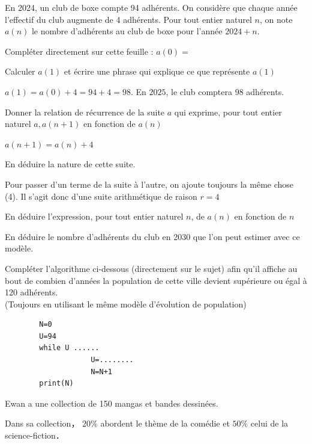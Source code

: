 \documentclass[11pt,a4paper]{article}  %
\begin{document}
En 2024, un club de boxe compte 94 adhérents. On considère que chaque année l'effectif du club augmente de 4 adhérents. Pour tout entier naturel $n$, on note $a(n)$ le nombre d'adhérents au club de boxe pour l'année $2024+n$.
\begin{enumMet}
	\item Compléter directement sur cette feuille : $a(0)=$\quad{}
	\item Calculer $a(1)$ et écrire une phrase qui explique ce que représente $a(1)$
	\begin{corrBox}
		$a(1)=a(0)+4=94+4=98$. En $2025$, le club comptera 98 adhérents.		
	\end{corrBox}
	\item \begin{enumMet}
		\item Donner la relation de récurrence de la suite $a$ qui exprime, pour tout entier naturel $a, a(n+1)$ en fonction de $a(n)$
		\begin{corrBox}
			$a(n+1)=a(n)+4$		
		\end{corrBox}
		\item En déduire la nature de cette suite.
		\begin{corrBox}
			Pour passer d'un terme de la suite à l'autre, on ajoute toujours la même chose (4). Il s'agit donc d'une suite arithmétique de raison $r=4$		
		\end{corrBox}
	\end{enumMet}
	\item En déduire l'expression, pour tout entier naturel $n$, de $a(n)$ en fonction de $n$
	\item En déduire le nombre d'adhérents du club en 2030 que l'on peut estimer avec ce modèle.
	\item Compléter l'algorithme ci-dessous (directement sur le sujet) afin qu'il affiche au bout de combien d'années la population de cette ville devient supérieure ou égal à 120 adhérents.\\
	(Toujours en utilisant le même modèle d'évolution de population)
	\begin{verbatim}
		N=0
		U=94
		while U ......
					U=........
					N=N+1
		print(N)
	\end{verbatim}
\end{enumMet}

\exerciceDS{}

Ewan a une collection de 150 mangas et bandes dessinées.

Dans sa collection， $20 \%$ abordent le thème de la comédie et $50 \%$ celui de la science-fiction．
\end{document}
